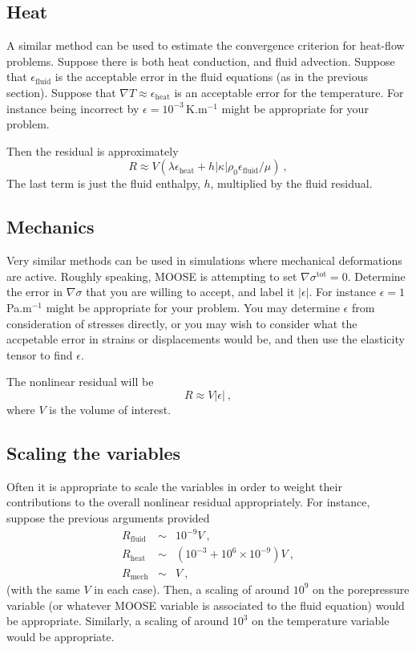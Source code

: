 \documentclass[12pt]{report}
\begin{document}
\subsection{Heat}

A similar method can be used to estimate the convergence criterion for
heat-flow problems.  Suppose there is both heat conduction, and fluid
advection.  Suppose that $\epsilon_{\mathrm{fluid}}$ is the acceptable
error in the fluid equations (as in the previous section).  Suppose
that $\nabla T \approx \epsilon_{\mathrm{heat}}$ is an acceptable
error for the temperature.  For instance being incorrect by $\epsilon
= 10^{-3}\,$K.m$^{-1}$ might be appropriate for your problem.

Then the residual is approximately
\begin{equation}
R \approx V(\lambda\epsilon_{\mathrm{heat}} +
h|\kappa|\rho_{0}\epsilon_{\mathrm{fluid}}/\mu) \ ,
\end{equation}
The last term is just the fluid enthalpy, $h$, multiplied by the fluid
residual.

\subsection{Mechanics}

Very similar methods can be used in simulations where mechanical
deformations are active.  Roughly speaking, MOOSE is attempting to set
$\nabla\sigma^{\mathrm{tot}} = 0$.  Determine the error in
$\nabla\sigma$ that you are willing to accept, and label it
$|\epsilon|$.  For instance $\epsilon = 1\,$Pa.m$^{-1}$ might be
appropriate for your problem.  You may determine $\epsilon$ from
consideration of stresses directly, or you may wish to consider what
the accpetable error in strains or displacements would be, and then
use the elasticity tensor to find $\epsilon$.

The nonlinear residual will be
\begin{equation}
R \approx V|\epsilon| \ ,
\end{equation}
where $V$ is the volume of interest.

\subsection{Scaling the variables}

Often it is appropriate to scale the variables in order to weight
their contributions to the overall nonlinear residual appropriately.
For instance, suppose the previous arguments provided
\begin{eqnarray}
R_{\mathrm{fluid}} & \sim & 10^{-9}V \ , \nonumber \\
R_{\mathrm{heat}} & \sim & (10^{-3} + 10^{6}\times 10^{-9}) V \ ,
\nonumber \\
R_{\mathrm{mech}} & \sim & V \ ,
\end{eqnarray}
(with the same $V$ in each case).  Then, a scaling of around $10^{9}$
on the porepressure variable (or whatever MOOSE variable is associated
to the fluid equation) would be appropriate.  Similarly, a scaling of
around $10^{3}$ on the temperature variable would be appropriate.
\end{document}

